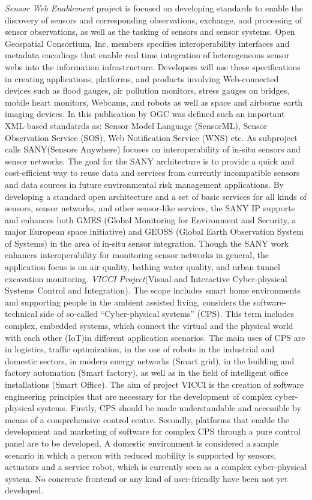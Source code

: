 \newline
	\emph{Sensor Web Enablement} project\cite{ogc} is focused on developing standards to enable the discovery of sensors and corresponding observations, exchange, and processing of sensor observations, as well as the tasking of sensors and sensor systems.
	 Open Geospatial Consortium, Inc. members specifies interoperability interfaces and metadata encodings that enable real time integration of heterogeneous sensor webs into the information infrastructure. Developers will use these specifications in creating applications, platforms, and products involving Web-connected devices such as flood gauges, air pollution monitors, stress gauges on bridges, mobile heart monitors, Webcams, and robots as well as space and airborne earth imaging devices. In this publication by OGC was defined such an important XML-based standatrds as: Sensor Model Language (SensorML), Sensor Observation Service (SOS), Web Notification Service (WNS) etc. As subproject calls SANY(Sensors Anywhere) focuses on interoperability of in-situ sensors and sensor networks. The goal for the SANY architecture is to provide a quick and cost-efficient way to reuse data and services from currently incompatible sensors and data sources in future environmental risk management applications. By developing a standard open architecture and a set of basic services for all kinds of sensors, sensor networks, and other sensor-like services, the SANY IP supports and enhances both GMES (Global Monitoring for Environment and Security, a major European space initiative) and GEOSS (Global Earth Observation System of Systems) in the area of in-situ sensor integration. Though the SANY work enhances interoperability for monitoring sensor networks in general, the application focus is on air quality, bathing water quality, and urban tunnel excavation monitoring.
\newline 
    \emph{VICCI Project}(Visual and Interactive Cyber-physical Systems Control and Integration)\cite{vicci,6548811}. The scope includes smart home environments and supporting people in the ambient assisted living, considers the software-technical side of so-called “Cyber-physical systems” (CPS). This term includes complex, embedded systems, which connect the virtual and the physical world with each other (IoT)in different application scenarios. The main uses of CPS are in logistics, traffic optimization, in the use of robots in the industrial and domestic sectors, in modern energy networks (Smart grid), in the building and factory automation (Smart factory), as well as in the field of intelligent office installations (Smart Office). The aim of project VICCI is the creation of software engineering principles that are necessary for the development of complex cyber-physical systems. Firstly, CPS should be made understandable and accessible by means of a comprehensive control centre. Secondly, platforms that enable the development and marketing of software for complex CPS through a pure control panel are to be developed. A domestic environment is considered a sample scenario in which a person with reduced mobility is supported by sensors, actuators and a service robot, which is currently seen as a complex cyber-physical system. No concreate frontend or any kind of user-friendly have been not yet developed. 

